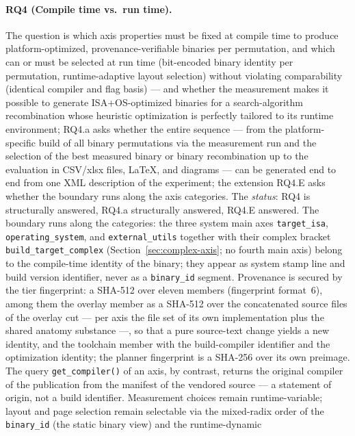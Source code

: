 \begin{nurlang}
\paragraph{RQ4 (Compile time vs.\ run time).} The question is which axis properties must be fixed
at compile time to produce platform-optimized, provenance-verifiable binaries per permutation, and
which can or must be selected at run time (bit-encoded binary identity per permutation,
runtime-adaptive layout selection) without violating comparability (identical compiler and flag
basis) --- and whether the measurement makes it possible to generate ISA+OS-optimized binaries for
a search-algorithm recombination whose heuristic optimization is perfectly tailored to its runtime
environment; RQ4.a asks whether the entire sequence --- from the platform-specific build of all
binary permutations via the measurement run and the selection of the best measured binary or
binary recombination up to the evaluation in CSV/xlsx files, LaTeX, and diagrams --- can be
generated end to end from one XML description of the experiment; the extension RQ4.E asks whether
the boundary runs along the axis categories.
The \emph{status}: RQ4 is structurally answered, RQ4.a structurally answered, RQ4.E answered. The
boundary runs along the categories: the three system main axes \texttt{target\_isa},
\texttt{operating\_system}, and \texttt{external\_utils} together with their complex bracket
\texttt{build\_target\_complex} (Section~\ref{sec:complex-axis}; no fourth main axis) belong to the
compile-time identity of the binary; they appear as system stamp line and build version
identifier, never as a \texttt{binary\_id} segment. Provenance is secured by the tier fingerprint:
a SHA-512 over eleven members (fingerprint format~6), among them the overlay member as a SHA-512
over the concatenated source files of the overlay cut --- per axis the file set of its own
implementation plus the shared anatomy substance ---, so that a pure source-text change yields a
new identity, and the toolchain member with the build-compiler identifier and the optimization
identity; the planner fingerprint is a SHA-256 over its own preimage. The query
\texttt{get\_compiler()} of an axis, by contrast, returns the original compiler of the publication
from the manifest of the vendored source --- a statement of origin, not a build identifier.
Measurement choices remain runtime-variable; layout and page selection remain selectable via the
mixed-radix order of the \texttt{binary\_id} (the static binary view) and the runtime-dynamic

\end{nurlang}
